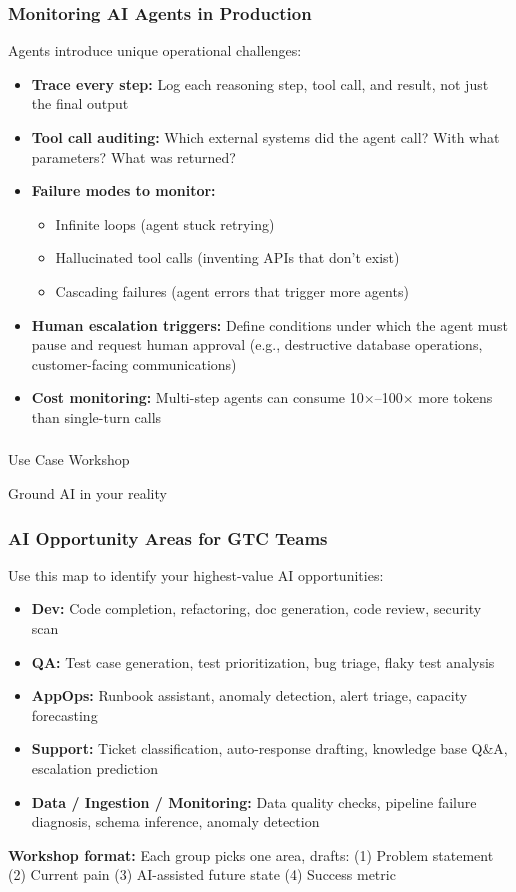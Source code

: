 \begin{frame}[fragile]\frametitle{Monitoring AI Agents in Production}
Agents introduce unique operational challenges:
\begin{itemize}
\item \textbf{Trace every step:} Log each reasoning step, tool call, and result, not just the final output
\item \textbf{Tool call auditing:} Which external systems did the agent call? With what parameters? What was returned?
\item \textbf{Failure modes to monitor:}
  \begin{itemize}
  \item Infinite loops (agent stuck retrying)
  \item Hallucinated tool calls (inventing APIs that don't exist)
  \item Cascading failures (agent errors that trigger more agents)
  \end{itemize}
\item \textbf{Human escalation triggers:} Define conditions under which the agent must pause and request human approval (e.g., destructive database operations, customer-facing communications)
\item \textbf{Cost monitoring:} Multi-step agents can consume 10$\times$--100$\times$ more tokens than single-turn calls
\end{itemize}
\end{frame}


\begin{frame}[fragile]\frametitle{}
\begin{center}
{\Large Use Case Workshop}

{\small Ground AI in your reality}
\end{center}
\end{frame}

\begin{frame}[fragile]\frametitle{AI Opportunity Areas for GTC Teams}
Use this map to identify your highest-value AI opportunities:
\begin{itemize}
\item \textbf{Dev:} Code completion, refactoring, doc generation, code review, security scan
\item \textbf{QA:} Test case generation, test prioritization, bug triage, flaky test analysis
\item \textbf{AppOps:} Runbook assistant, anomaly detection, alert triage, capacity forecasting
\item \textbf{Support:} Ticket classification, auto-response drafting, knowledge base Q\&A, escalation prediction
\item \textbf{Data / Ingestion / Monitoring:} Data quality checks, pipeline failure diagnosis, schema inference, anomaly detection
\end{itemize}
\textbf{Workshop format:} Each group picks one area, drafts: (1) Problem statement (2) Current pain (3) AI-assisted future state (4) Success metric
\end{frame}

